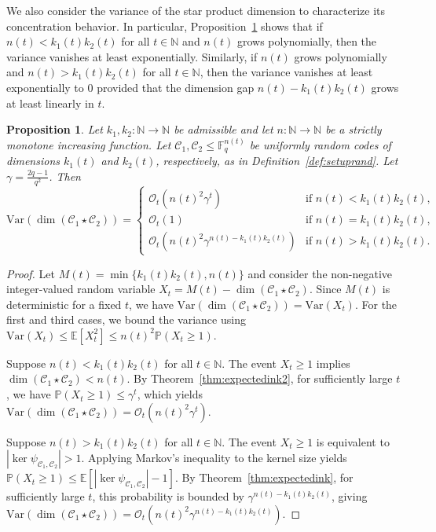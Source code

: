 \documentclass[a4paper,11pt,reqno]{article}
\newcommand{\F}{\mathbb{F}}
\newcommand{\C}{\mathcal{C}}
\newcommand{\NN}{\mathbb N}
\theoremstyle{plain} \numberwithin{equation}{section}
\newtheorem{proposition}[theorem]{Proposition}
\theoremstyle{definition}
\begin{document}
{ 
We also consider the variance of the star product dimension to characterize its concentration behavior. In particular, Proposition~\ref{prop:variance_t} shows that if $n(t)<k_1(t)k_2(t)$ for all $t\in \NN$ and $n(t)$ grows polynomially, then the variance vanishes at least exponentially. Similarly, if $n(t)$ grows polynomially and $n(t)> k_1(t)k_2(t)$ for all $t\in \NN$, then the variance vanishes at least exponentially to $0$ provided that the dimension gap $n(t)-k_1(t)k_2(t)$ grows at least linearly in $t$.


\begin{proposition}\label{prop:variance_t}
    Let $k_1,k_2\colon \NN \rightarrow \NN$ be admissible and let $n\colon \NN\rightarrow \NN$ be a strictly monotone increasing function. Let $\C_1,\C_2\leq \F_q^{n(t)}$ be uniformly random codes of dimensions $k_1(t)$ and $k_2(t)$, respectively, as in Definition~\ref{def:setuprand}. Let $\gamma=\frac{2q-1}{q^2}$. Then
    $$
        \mathrm{Var}(\dim (\C_1\star \C_2)) = \begin{cases}
            \mathcal{O}_t\left(n(t)^2\gamma^t\right) & \text{if } n(t)<k_1(t)k_2(t), \\
            \mathcal{O}_t(1) & \text{if } n(t)=k_1(t)k_2(t), \\
            \mathcal{O}_t\left(n(t)^2\gamma^{n(t)-k_1(t)k_2(t)}\right) & \text{if } n(t)>k_1(t)k_2(t).
        \end{cases}
    $$
\end{proposition}
\begin{proof}
Let $M(t)=\min\{k_1(t)k_2(t),n(t)\}$ and consider the non-negative integer-valued random variable $X_t=M(t)-\dim (\C_1\star \C_2)$. Since $M(t)$ is deterministic for a fixed $t$, we have $\mathrm{Var}(\dim (\C_1\star \C_2)) = \mathrm{Var}(X_t)$. For the first and third cases, we bound the variance using $\mathrm{Var}(X_t) \leq \mathbb{E}[X_t^2] \leq n(t)^2\mathbb{P}(X_t\geq 1)$.

    Suppose $n(t)< k_1(t)k_2(t)$ for all $t\in \NN$. The event $X_t \geq 1$ implies $\dim(\C_1\star \C_2) <n(t)$. By Theorem~\ref{thm:expectedink2}, for sufficiently large $t$, we have $\mathbb{P}(X_t\geq 1)\leq \gamma^t$, which yields $\mathrm{Var}(\dim(\C_1\star \C_2)) = \mathcal{O}_t(n(t)^2 \gamma^t)$.

    Suppose $n(t)> k_1(t)k_2(t)$ for all $t\in \NN$. The event $X_t\geq 1$ is equivalent to $|\ker \psi_{\C_1,\C_2}|>1$. Applying Markov's inequality to the kernel size yields $\mathbb{P}(X_t\geq 1) \leq \mathbb{E}[|\ker \psi_{\C_1,\C_2}| - 1]$. By Theorem~\ref{thm:expectedink}, for sufficiently large $t$, this probability is bounded by $\gamma^{n(t)-k_1(t)k_2(t)}$, giving $\mathrm{Var}(\dim(\C_1\star \C_2)) = \mathcal{O}_t\left(n(t)^2 \gamma^{n(t)-k_1(t)k_2(t)}\right)$.


\end{proof}}
\end{document}
